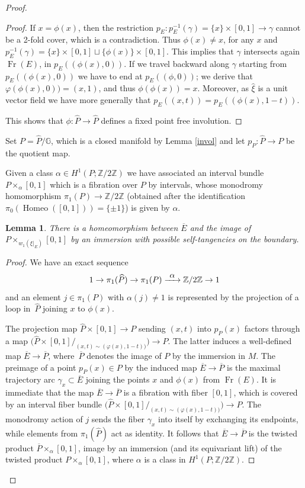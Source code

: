 \documentclass[10pt]{amsart}
\DeclareMathOperator{\Fr}{Fr}
\DeclareMathOperator{\Homeo}{Homeo}
\newcommand{\To}[1]{\mathchoice{\xrightarrow{\textstyle\kern4pt#1\kern3pt}}{\stackrel{#1}{\longrightarrow}}{}{}}
\newtheorem{lemma}[theorem]{Lemma}
\theoremstyle{definition}
\theoremstyle{remark}
\numberwithin{equation}{section}
\newcommand{\ZZ}{\mathbb Z}
\begin{document}
\begin{proof}
\begin{proof}
If $x=\phi(x)$, then the restriction $p_E: p_E^{-1}(\gamma)=\{x\}\times [0,1]\to \gamma$
cannot be a 2-fold cover, which is a contradiction. Thus $\phi(x)\neq x$, for any $x$ and
$p_E^{-1}(\gamma)=\{x\}\times [0,1]\sqcup \{\phi(x)\}\times [0,1]$. This implies that $\gamma$ intersects again
$\Fr(E)$, in $p_E((\phi(x),0))$.
If we travel backward along $\gamma$ starting from $p_E((\phi(x),0))$ we have to end at
$p_E((\phi,0))$; we derive that $\varphi(\phi(x),0))=(x,1)$, and thus $\phi(\phi(x))=x$.
Moreover, as $\widehat{\xi}$ is a unit vector field we have more generally that $p_E((x,t))=p_E((\phi(x),1-t))$.

This shows that $\phi:\widehat{P}\to\widehat{P}$ defines a fixed point free involution.
\end{proof}

Set $P=\widehat{P}/\mathbb G$, which is a closed manifold by Lemma \ref{invol} and let
$p_P:\widehat{P}\to P$ be the quotient map.

Given a class $\alpha\in H^1(P;\ZZ/2\ZZ)$ we have associated an interval bundle $P\times_{\alpha} [0,1]$
which is a fibration over $P$ by intervals, whose monodromy homomorphism $\pi_1(P)\to \ZZ/2\ZZ$ (obtained after
the identification $\pi_0(\Homeo([0,1]))=\{\pm 1\}$) is given by $\alpha$.

\begin{lemma}
There is a homeomorphism between $\overline{E}$ and the image of
\hbox{$\!P\!\times_{w_1(\xi|_E)}\!\![0,1]$} by an immersion with possible self-tangencies on the boundary.
\end{lemma}
\begin{proof}
We have an exact sequence
\[ 1\to \pi_1(\widehat{P})\to \pi_1(P)\To{\alpha} \ZZ/2\ZZ\to 1\]
and an element $j\in \pi_1(P)$ with $\alpha(j)\neq 1$ is represented by the projection of a loop in~$\widehat{P}$
joining $x$ to $\phi(x)$.

The projection map $\widehat{P}\times [0,1]\to P$ sending $(x,t)$ into $p_P(x)$ factors through a map
$\bigl(\widehat{P}\times [0,1]/_{(x,t)\sim (\varphi(x),1-t))}\bigr)\to P$. The latter induces
a well-defined map $\overline{E}\to \overline{P}$, where~$\overline{P}$ denotes the image of
$P$ by the immersion in $M$. The preimage of a point $p_P(x)\in P$ by the
induced map $\overline{E}\to \overline{P}$ is the maximal trajectory arc
$\gamma_x\subset \overline{E}$ joining the points
$x$ and $\phi(x)$ from $\Fr(E)$. It is immediate that the map $\overline{E}\to \overline{P}$
is a fibration with fiber $[0,1]$, which is covered by an interval
fiber bundle \hbox{$\bigl(\widehat{P}\times [0,1]/_{(x,t)\sim (\varphi(x),1-t))}\bigr)\to P$}.
The monodromy action of $j$ sends the fiber $\gamma_x$ into itself by exchanging its endpoints, while elements from $\pi_1(\widehat{P})$ act as identity. It follows that $\overline{E}\to \overline{P}$ is the twisted product $\overline{P}\times_{\alpha} [0,1]$, image by an immersion (and its equivariant lift) of the twisted product
$P\times_{\alpha} [0,1]$, where $\alpha$ is a class in $H^1(P;\ZZ/2\ZZ)$.


\end{proof}
\end{proof}
\end{document}
